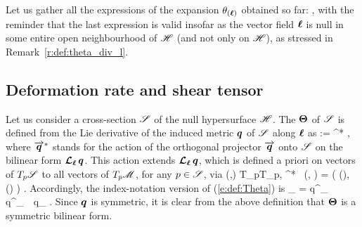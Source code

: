 {Let us gather all the expressions of the expansion $\theta_{(\bm{\ell})}$ obtained
so far:
\be \label{e:def:theta_l_all}
     ,
\ee
with the reminder that the last expression is valid insofar as the vector field $\bm{\ell}$ is
null in some entire open neighbourhood of $\mathscr{H}$ (and not only on $\mathscr{H}$), as
stressed in Remark~\ref{r:def:theta_div_l}.

\subsection{Deformation rate and shear tensor}

Let us consider a cross-section $\mathscr{S}$ of the null hypersurface $\mathscr{H}$.
The  $\bm{\Theta}$ of $\mathscr{S}$ is defined from the Lie
derivative of the induced metric $\bm{q}$ of $\mathscr{S}$ along $\bm{\ell}$ as
\be \label{e:def:Theta}
    \w{\Theta} :=  ^* \Lie{\el}  ,
\ee
where $\overrightarrow{\bm{q}}^*$ stands for the action of the orthogonal projector $\overrightarrow{\bm{q}}$
onto $\mathscr{S}$ on the bilinear form $\bm{\mathcal{L}}_{\bm{\ell}}\, \bm{q}$.
This action extends $\bm{\mathcal{L}}_{\bm{\ell}}\, \bm{q}$, which is defined a priori on
vectors of $T_p\mathscr{S}$ to all vectors of $T_p\mathscr{M}$, for any $p\in\mathscr{S}$, via
\be
    \forall (,) \in T_p\M \times T_p\M, \quad
         ^* \Lie{\el} \,  (, ) =
         \Lie{\el}  \left( (), () \right) .
\ee
Accordingly, the index-notation version of (\ref{e:def:Theta}) is
\be \label{e:def:Theta_index}
    \Theta_{\alpha\beta} =  q^\mu_{\ \, \alpha} q^\nu_{\ \, \beta}
            \Liec{\el} q_{\mu\nu} .
\ee
Since $\bm{q}$ is symmetric, it is clear from the above definition that
$\bm{\Theta}$ is a symmetric bilinear form.

}

